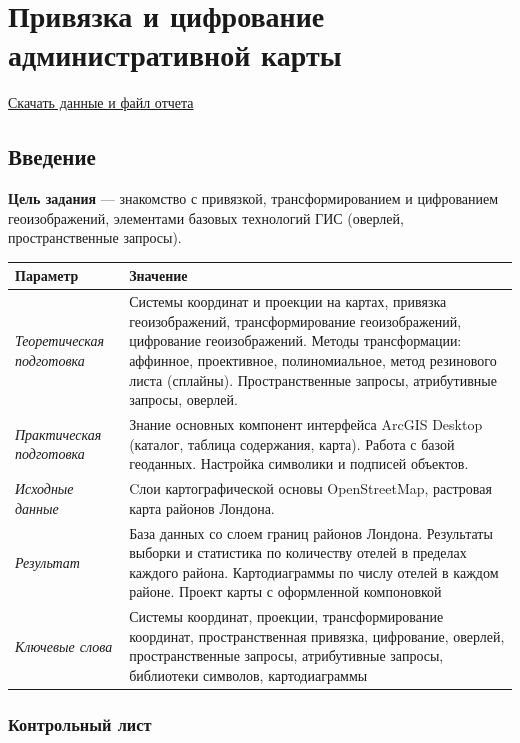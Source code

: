 \documentclass[12pt,]{book}
\begin{document}
\hypertarget{map-ref-economic}{%
\chapter{Привязка и цифрование административной карты}\label{map-ref-economic}}

\href{http://autolab.geogr.msu.ru/gis/data/Ex07.zip}{Скачать данные и файл отчета}

\hypertarget{map-ref-economic-intro}{%
\section{Введение}\label{map-ref-economic-intro}}

\textbf{Цель задания} --- знакомство с привязкой, трансформированием и цифрованием геоизображений, элементами базовых технологий ГИС (оверлей, пространственные запросы).

\begin{longtable}[]{@{}ll@{}}
\toprule
Параметр & Значение\tabularnewline
\midrule
\endhead
\emph{Теоретическая подготовка} & Системы координат и проекции на картах, привязка геоизображений, трансформирование геоизображений, цифрование геоизображений. Методы трансформации: аффинное, проективное, полиномиальное, метод резинового листа (сплайны). Пространственные запросы, атрибутивные запросы, оверлей.\tabularnewline
\emph{Практическая подготовка} & Знание основных компонент интерфейса ArcGIS Desktop (каталог, таблица содержания, карта). Работа с базой геоданных. Настройка символики и подписей объектов.\tabularnewline
\emph{Исходные данные} & Cлои картографической основы OpenStreetMap, растровая карта районов Лондона.\tabularnewline
\emph{Результат} & База данных со слоем границ районов Лондона. Результаты выборки и статистика по количеству отелей в пределах каждого района. Картодиаграммы по числу отелей в каждом районе. Проект карты с оформленной компоновкой\tabularnewline
\emph{Ключевые слова} & Системы координат, проекции, трансформирование координат, пространственная привязка, цифрование, оверлей, пространственные запросы, атрибутивные запросы, библиотеки символов, картодиаграммы\tabularnewline
\bottomrule
\end{longtable}

\hypertarget{map-ref-economic-control}{%
\subsection{Контрольный лист}\label{map-ref-economic-control}}
\end{document}
